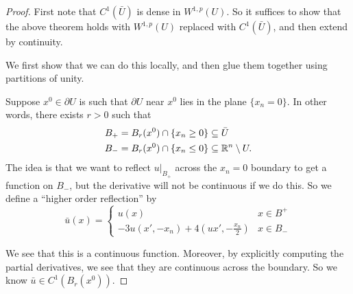 \documentclass[a4paper]{article}
\begin{document}
\begin{proof}
  First note that $C^1(\bar{U})$ is dense in $W^{1, p}(U)$. So it suffices to show that the above theorem holds with $W^{1, p}(U)$ replaced with $C^1(\bar{U})$, and then extend by continuity.

  We first show that we can do this locally, and then glue them together using partitions of unity.

  Suppose $x^0 \in \partial U$ is such that $\partial U$ near $x^0$ lies in the plane $\{x_n = 0\}$. In other words, there exists $r > 0$ such that
  \begin{align*}
    B_+ &= B_r(x^0) \cap \{x_n \geq 0\} \subseteq \bar{U}\\
    B_- &= B_r(x^0) \cap \{x_n \leq 0\} \subseteq \mathbb{R}^n \setminus U.
  \end{align*}
  The idea is that we want to reflect $u|_{B_+}$ across the $x_n = 0$ boundary to get a function on $B_{-}$, but the derivative will not be continuous if we do this. So we define a ``higher order reflection'' by
  \[
    \bar{u}(x) =
    \begin{cases}
      u(x) & x \in B^+\\
      -3u(x', -x_n) + 4\left(u x', -\frac{x_n}{2}\right) & x \in B_-
    \end{cases}
  \]
  \begin{center}
  \end{center}
  We see that this is a continuous function. Moreover, by explicitly computing the partial derivatives, we see that they are continuous across the boundary. So we know $\bar{u} \in C^1(B_r(x^0))$.


\end{proof}
\end{document}
